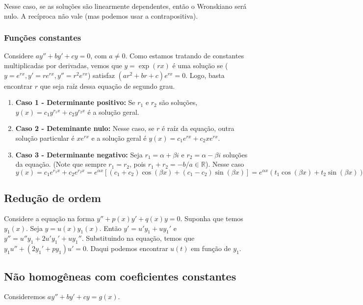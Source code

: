 \documentclass[12pt]{article}
\begin{document}
Nesse caso, se as soluções são linearmente dependentes, então o Wronskiano
será nulo. A recíproca não vale (mas podemos usar a contrapositiva). 

\subsubsection{Funções constantes}

Considere $ay'' + by' + cy = 0$, com $a \neq 0$. Como estamos tratando de
constantes multiplicadas por derivadas, vemos que $y = \exp(rx)$ é uma
solução se ($y = e^{rx}, y' = re^{rx}, y'' = r^2e^{rx}$) satisfaz $(ar^2 + br
+ c)e^{rx} = 0$. Logo, basta encontrar $r$ que seja raíz dessa equação de
segundo grau. 

\begin{enumerate}
    \item \textbf{Caso 1 - Determinante positivo:} Se $r_1$ e $r_2$ são
    soluções, $y(x) = c_1y^{r_1x} + c_2y^{r_2x}$ é a solução geral.
    \item \textbf{Caso 2 - Deteminante nulo:} Nesse caso, se $r$ é raíz da
    equação, outra solução particular é $xe^{rx}$ e a solução geral é $y(x) =
    c_1e^{rx} + c_2xe^{rx}$.  
    \item \textbf{Caso 3 - Determinante negativo:} Seja $r_1 = \alpha + \beta
    i$ e $r_2 = \alpha - \beta i$ soluções da equação. (Note que sempre $r_1
    = r_2$, pois $r_1 + r_2 = -b/a \in \mathbb{R}$).  Nesse caso $y(x) =
    c_1e^{r_1x} + c_2e^{r_2x} = e^{\alpha x}[(c_1 + c_2)\cos(\beta x) + (c_1 -
    c_2)\sin(\beta x)] = e^{\alpha x}(t_1\cos(\beta x) + t_2\sin(\beta x))$
\end{enumerate}

\subsection{Redução de ordem}

Considere a equação na forma $y'' + p(x)y' + q(x)y = 0$. Suponha que temos
$y_1(x)$. Seja $y = u(x)y_1(x)$. Então $y' = u'y_1 + uy_1'$ e $y'' = u''y_1 +
2u'y_1' + uy_1''$. Substituindo na equação, temos que $y_1u'' + (2y_1' +
py_1)u' = 0$. Daqui podemos encontrar $u(t)$ em função de $y_1$. 

\subsection{Não homogêneas com coeficientes constantes}

Consideremos $ay'' + by' + cy = g(x)$.  
\end{document}
